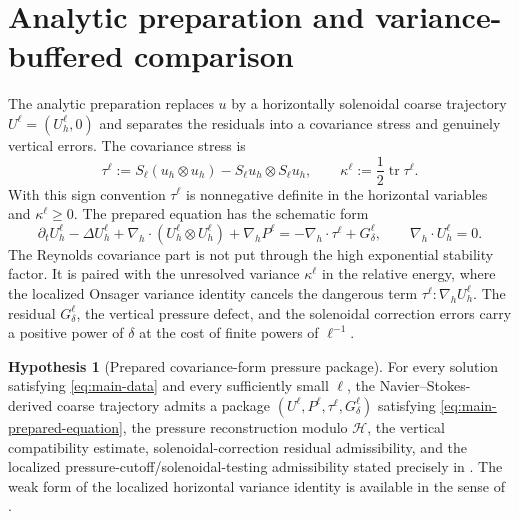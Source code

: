 \documentclass[11pt]{article}
\numberwithin{equation}{section}
\theoremstyle{plain}
\theoremstyle{definition}
\newtheorem{hypothesis}{Hypothesis}[section]
\theoremstyle{remark}
\newcommand{\tr}{\operatorname{tr}}
\newcommand{\calH}{\mathcal H}
\begin{document}
\section{Analytic preparation and variance-buffered comparison}\label{sec:main-analytic}

The analytic preparation replaces \(u\) by a horizontally solenoidal coarse trajectory \(U^\ell=(U_h^\ell,0)\) and separates the residuals into a covariance stress and genuinely vertical errors.  The covariance stress is
\begin{equation}\label{eq:main-covariance}
        \tau^\ell:=S_\ell(u_h\otimes u_h)-S_\ell u_h\otimes S_\ell u_h,
        \qquad
        \kappa^\ell:=\frac12\tr\tau^\ell.
\end{equation}
With this sign convention \(\tau^\ell\) is nonnegative definite in the horizontal variables and \(\kappa^\ell\ge0\).  The prepared equation has the schematic form
\begin{equation}\label{eq:main-prepared-equation}
        \partial_tU_h^\ell-\Delta U_h^\ell+
        \nabla_h\cdot(U_h^\ell\otimes U_h^\ell)+\nabla_hP^\ell
        =-\nabla_h\cdot\tau^\ell+G_\delta^\ell,
        \qquad \nabla_h\cdot U_h^\ell=0.
\end{equation}
The Reynolds covariance part is not put through the high exponential stability factor.  It is paired with the unresolved variance \(\kappa^\ell\) in the relative energy, where the localized Onsager variance identity cancels the dangerous term \(\tau^\ell:\nabla_hU_h^\ell\).  The residual \(G^\ell_\delta\), the vertical pressure defect, and the solenoidal correction errors carry a positive power of \(\delta\) at the cost of finite powers of \(\ell^{-1}\).

\begin{hypothesis}[Prepared covariance-form pressure package]\label{hyp:main-prepared-package}
For every solution satisfying \eqref{eq:main-data} and every sufficiently small \(\ell\), the Navier--Stokes-derived coarse trajectory admits a package \((U^\ell,P^\ell,\tau^\ell,G_\delta^\ell)\) satisfying \eqref{eq:main-prepared-equation}, the pressure reconstruction modulo \(\calH\), the vertical compatibility estimate, solenoidal-correction residual admissibility, and the localized pressure-cutoff/solenoidal-testing admissibility stated precisely in .  The weak form of the localized horizontal variance identity is available in the sense of .
\end{hypothesis}
\end{document}
